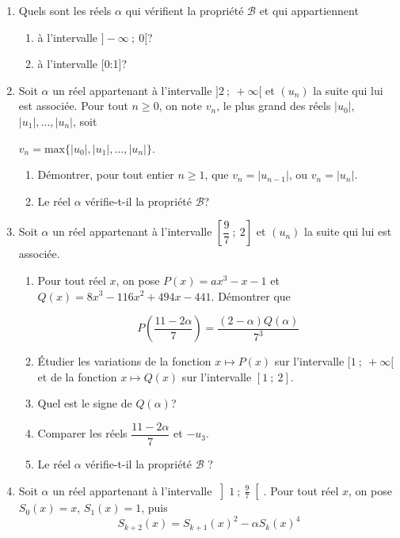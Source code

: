 \documentclass[11pt,a4paper,french]{article}
\begin{document}
\medskip

\begin{enumerate}[resume]
\item  Quels sont les réels $\alpha$ qui vérifient la propriété $\mathcal{B}$ et qui appartiennent
\begin{enumerate}
\item  à l'intervalle $]-\infty~;~0[$? 
\item à l'intervalle [0:1]? 
\end{enumerate}
\item Soit $\alpha$ un réel appartenant à l'intervalle $]2~;~+\infty[$ et $(u_n)$ la suite qui lui est associée. Pour tout $n\geqslant 0$, on note $v_n$, le plus grand des réels $\vert u_0\vert$, $\vert u_1\vert,\dots,\vert u_n\vert$, soit 

$v_n = \mathrm{max}\{\vert u_0\vert,\vert u_1\vert,\dots,\vert u_n\vert\}$. 
\begin{enumerate}
\item  Démontrer, pour tout entier $n \geqslant 1$, que $v_n=\vert u_{n-1}\vert$, ou $v_n=\vert u_n\vert$. 
\item Le réel $\alpha$ vérifie-t-il la propriété $\mathcal{B}$?
\end{enumerate}
\item Soit $\alpha$ un réel appartenant à l'intervalle $\left[\dfrac{9}{7}~;~2\right]$ et $(u_n)$ la suite qui lui est associée.
\begin{enumerate}
\item  Pour tout réel $x$, on pose $ P(x)= ax^3- x -1$ et $Q(x) =8x^3 -116x^2 + 494x- 441$. Démontrer que

\[P\left(\dfrac{11-2\alpha}{7}\right)=\dfrac{(2-\alpha)Q(\alpha)}{7^3}\]

\item Étudier les variations de la fonction $x\mapsto P(x)$ sur l'intervalle $[1~;~+\infty[$ et de la fonction $x\mapsto Q(x)$ sur l'intervalle $[1~;~2]$.
\item Quel est le signe de $Q(\alpha)$?
\item Comparer les réels $\dfrac{11-2\alpha}{7}$ et $-u_3$.
\item Le réel $\alpha$ vérifie-t-il la propriété $\mathcal{B}$ ?
\end{enumerate}
\item Soit $\alpha$ un réel appartenant à l'intervalle $\left]1~;~\frac{9}{7}\right[$. Pour tout réel $x$, on pose $S_0(x)= x$, $S_1(x) = 1$, puis
\[S_{k+2}(x)=S_{k+1}(x)^2-\alpha S_k(x)^4\]


\end{enumerate}
\end{document}
